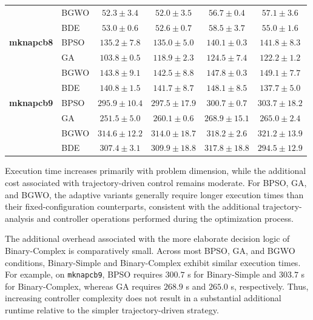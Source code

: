 \documentclass[journal,article,submit,moreauthors]{Definitions/mdpi}
\begin{document}
\begin{table}[htbp]
\begin{tabular*}{\textwidth}{@{\extracolsep{\fill}}llcccc@{}}
                       & BGWO  & $52.3 \pm 3.4$ & $\mathbf{52.0 \pm 3.5}$ & $56.7 \pm 0.4$ & $57.1 \pm 3.6$ \\
                       & BDE   & $53.0 \pm 0.6$ & $\mathbf{52.6 \pm 0.7}$ & $58.5 \pm 3.7$ & $55.0 \pm 1.6$ \\
    \midrule
    \textbf{mknapcb8}  & BPSO  & $135.2 \pm 7.8$ & $\mathbf{135.0 \pm 5.0}$ & $140.1 \pm 0.3$ & $141.8 \pm 8.3$ \\
                       & GA    & $\mathbf{103.8 \pm 0.5}$ & $118.9 \pm 2.3$ & $124.5 \pm 7.4$ & $122.2 \pm 1.2$ \\
                       & BGWO  & $143.8 \pm 9.1$ & $\mathbf{142.5 \pm 8.8}$ & $147.8 \pm 0.3$ & $149.1 \pm 7.7$ \\
                       & BDE   & $140.8 \pm 1.5$ & $141.7 \pm 8.7$ & $148.1 \pm 8.5$ & $\mathbf{137.7 \pm 5.0}$ \\
    \midrule
    \textbf{mknapcb9}  & BPSO  & $\mathbf{295.9 \pm 10.4}$ & $297.5 \pm 17.9$ & $300.7 \pm 0.7$ & $303.7 \pm 18.2$ \\
                       & GA    & $\mathbf{251.5 \pm 5.0}$ & $260.1 \pm 0.6$ & $268.9 \pm 15.1$ & $265.0 \pm 2.4$ \\
                       & BGWO  & $314.6 \pm 12.2$ & $\mathbf{314.0 \pm 18.7}$ & $318.2 \pm 2.6$ & $321.2 \pm 13.9$ \\
                       & BDE   & $307.4 \pm 3.1$ & $309.9 \pm 18.8$ & $317.8 \pm 18.8$ & $\mathbf{294.5 \pm 12.9}$ \\
    \bottomrule
  \end{tabular*}
\end{table}

Execution time increases primarily with problem dimension, while the
additional cost associated with trajectory-driven control remains moderate.
For BPSO, GA, and BGWO, the adaptive variants generally require longer
execution times than their fixed-configuration counterparts, consistent with
the additional trajectory-analysis and controller operations performed
during the optimization process.

The additional overhead associated with the more elaborate decision logic
of Binary-Complex is comparatively small. Across most BPSO, GA, and BGWO
conditions, Binary-Simple and Binary-Complex exhibit similar execution
times. For example, on \texttt{mknapcb9}, BPSO requires $300.7$ s for
Binary-Simple and $303.7$ s for Binary-Complex, whereas GA requires
$268.9$ s and $265.0$ s, respectively. Thus, increasing controller
complexity does not result in a substantial additional runtime relative to
the simpler trajectory-driven strategy.
\end{document}
